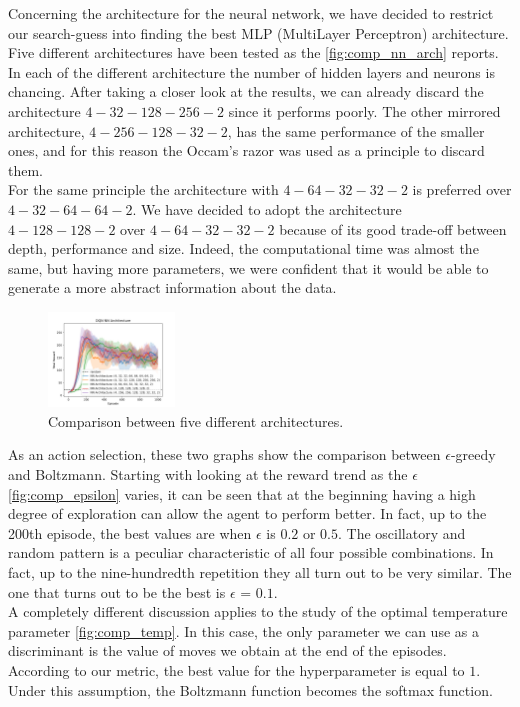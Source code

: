 \documentclass{article}
\begin{document}
   Concerning the architecture for the neural network, we have decided to restrict our search-guess into finding the best MLP (MultiLayer Perceptron) architecture.
   Five different architectures have been tested as the \autoref{fig:comp_nn_arch} reports. 
   In each of the different architecture the number of hidden layers and neurons is chancing. 
   After taking a closer look at the results, we can already discard the architecture $4-32-128-256-2$ since it performs poorly. 
   The other mirrored architecture, $4-256-128-32-2$, has the same performance of the smaller ones, and for this reason the Occam's razor was used as a principle to discard them.\\
   For the same principle the architecture with $4-64-32-32-2$ is preferred over $4-32-64-64-2$. 
   We have decided to adopt the architecture $4-128-128-2$ over $4-64-32-32-2$ because of its good trade-off between depth, performance and size. 
   Indeed, the computational time was almost the same, but having more parameters, we were confident that it would be able to generate a more abstract information about the data.\\
   \begin{figure}[ht!]
      \centering
      \includegraphics[width=0.3\textwidth]{assets/fig_hp/nn_architecture.png}
      \caption{Comparison between five different architectures. 
      }
      \label{fig:comp_nn_arch}
   \end{figure}

   As an action selection, these two graphs show the comparison between $\epsilon$-greedy and Boltzmann. 
   Starting with looking at the reward trend as the $\epsilon$ \autoref{fig:comp_epsilon} varies, 
   it can be seen that at the beginning having a high degree of exploration can allow the agent to perform better. 
   In fact, up to the 200th episode, the best values are when $\epsilon$ is $0.2$ or $0.5$.  
   The oscillatory and random pattern is a peculiar characteristic of all four possible combinations. 
   In fact, up to the nine-hundredth repetition they all turn out to be very similar. 
   The one that turns out to be the best is $\epsilon$ = $0.1$.\\
   A completely different discussion applies to the study of the optimal temperature parameter \autoref{fig:comp_temp}. 
   In this case, the only parameter we can use as a discriminant is the value of moves we obtain at the end of the episodes. 
   According to our metric, the best value for the hyperparameter is equal to $1$. Under this assumption, the Boltzmann function becomes the softmax function. 
\end{document}

